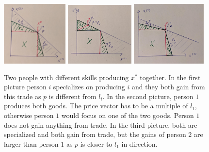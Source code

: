 \begin{figure}
	\includegraphics[width=0.3\textwidth]{images/2_people_trade_fair.jpeg}
	\includegraphics[width=0.31\textwidth]{images/2_people_trade_half_specialization.jpeg}
	\includegraphics[width=0.34\textwidth]{images/2_people_trade_unfair.jpeg}
	\caption{
		Two people with different skills producing \(x^*\) together. In the first
		picture person \(i\) specializes on producing \(i\) and they both gain
		from this trade as \(p\) is different from \(l_i\). In the second picture,
		person \(1\) produces both goods. The price vector has to be a multiple of
		\(l_1\), otherwise person \(1\) would focus on one of the two goods.
		Person \(1\) does not gain anything from trade. In the third picture, both
		are specialized and both gain from trade, but the gains of person \(2\)
		are larger than person \(1\) as \(p\) is closer to \(l_1\) in direction.
	}
\end{figure}

